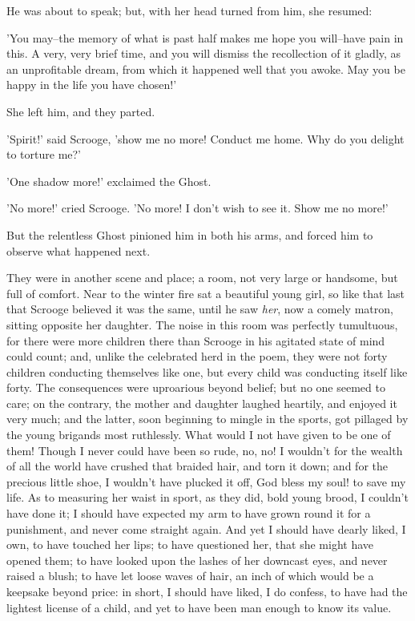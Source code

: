 He was about to speak; but, with her head turned from him, she resumed:

'You may--the memory of what is past half makes me hope you will--have
pain in this. A very, very brief time, and you will dismiss the
recollection of it gladly, as an unprofitable dream, from which it
happened well that you awoke. May you be happy in the life you have
chosen!'

She left him, and they parted.

'Spirit!' said Scrooge, 'show me no more! Conduct me home. Why do you
delight to torture me?'

'One shadow more!' exclaimed the Ghost.

'No more!' cried Scrooge. 'No more! I don't wish to see it. Show me no
more!'

But the relentless Ghost pinioned him in both his arms, and forced him
to observe what happened next.

They were in another scene and place; a room, not very large or
handsome, but full of comfort. Near to the winter fire sat a beautiful
young girl, so like that last that Scrooge believed it was the same,
until he saw \emph{her}, now a comely matron, sitting opposite her daughter.
The noise in this room was perfectly tumultuous, for there were more
children there than Scrooge in his agitated state of mind could count;
and, unlike the celebrated herd in the poem, they were not forty
children conducting themselves like one, but every child was conducting
itself like forty. The consequences were uproarious beyond belief; but
no one seemed to care; on the contrary, the mother and daughter laughed
heartily, and enjoyed it very much; and the latter, soon beginning to
mingle in the sports, got pillaged by the young brigands most
ruthlessly. What would I not have given to be one of them! Though I
never could have been so rude, no, no! I wouldn't for the wealth of all
the world have crushed that braided hair, and torn it down; and for the
precious little shoe, I wouldn't have plucked it off, God bless my soul!
to save my life. As to measuring her waist in sport, as they did, bold
young brood, I couldn't have done it; I should have expected my arm to
have grown round it for a punishment, and never come straight again. And
yet I should have dearly liked, I own, to have touched her lips; to have
questioned her, that she might have opened them; to have looked upon the
lashes of her downcast eyes, and never raised a blush; to have let loose
waves of hair, an inch of which would be a keepsake beyond price: in
short, I should have liked, I do confess, to have had the lightest
license of a child, and yet to have been man enough to know its value.

